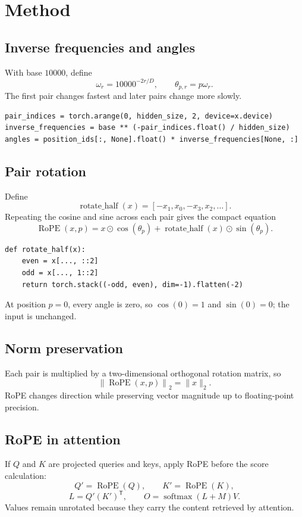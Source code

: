 \documentclass[11pt]{article}
\begin{document}
\section{Method}
\subsection{Inverse frequencies and angles}
With base $10000$, define
\[
\omega_r=10000^{-2r/D},\qquad
\theta_{p,r}=p\omega_r.
\]
The first pair changes fastest and later pairs change more slowly.

\begin{lstlisting}
pair_indices = torch.arange(0, hidden_size, 2, device=x.device)
inverse_frequencies = base ** (-pair_indices.float() / hidden_size)
angles = position_ids[:, None].float() * inverse_frequencies[None, :]
\end{lstlisting}

\subsection{Pair rotation}
Define
\[
\operatorname{rotate\_half}(x)=[-x_1,x_0,-x_3,x_2,\ldots].
\]
Repeating the cosine and sine across each pair gives the compact equation
\[
\operatorname{RoPE}(x,p)=x\odot\cos(\theta_p)
+\operatorname{rotate\_half}(x)\odot\sin(\theta_p).
\]

\begin{lstlisting}
def rotate_half(x):
    even = x[..., ::2]
    odd = x[..., 1::2]
    return torch.stack((-odd, even), dim=-1).flatten(-2)
\end{lstlisting}

At position $p=0$, every angle is zero, so $\cos(0)=1$ and $\sin(0)=0$;
the input is unchanged.

\subsection{Norm preservation}
Each pair is multiplied by a two-dimensional orthogonal rotation matrix, so
\[
\left\|\operatorname{RoPE}(x,p)\right\|_2=\|x\|_2.
\]
RoPE changes direction while preserving vector magnitude up to floating-point
precision.

\subsection{RoPE in attention}
If $Q$ and $K$ are projected queries and keys, apply RoPE before the score
calculation:
\[
Q'=\operatorname{RoPE}(Q),\qquad K'=\operatorname{RoPE}(K),
\]
\[
L=Q'(K')^\mathsf{T},\qquad
O=\operatorname{softmax}(L+M)V.
\]
Values remain unrotated because they carry the content retrieved by attention.
\end{document}
